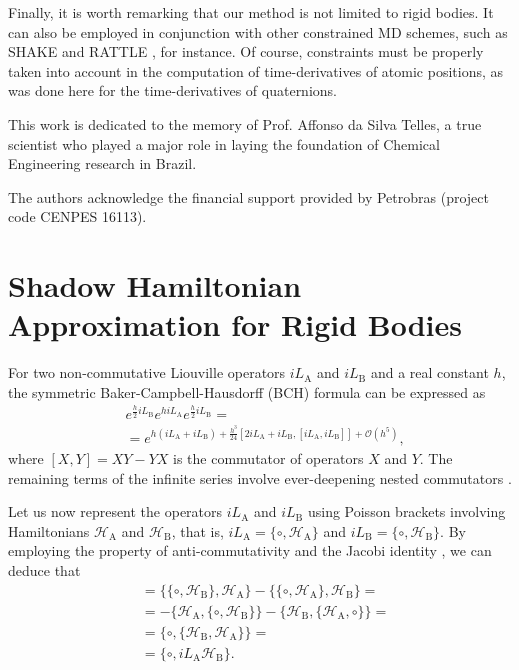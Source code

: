 \documentclass[
	aip,
	jcp,
	reprint,
]{revtex4-1}
\newcommand{\Ham}[1]{{\mathcal H}_\text{#1}}           %
\newcommand{\Liu}[1]{i\!L_\text{#1}}                   %
\newcommand{\timestep}{h}
\begin{document}
Finally, it is worth remarking that our method is not limited to rigid bodies.
It can also be employed in conjunction with other constrained MD schemes, such as SHAKE \cite{Ryckaert_1977} and RATTLE \cite{Andersen_1983}, for instance.
Of course, constraints must be properly taken into account in the computation of time-derivatives of atomic positions, as was done here for the time-derivatives of quaternions.

\begin{acknowledgements}
This work is dedicated to the memory of Prof. Affonso da Silva Telles, a true scientist who played a major role in laying the foundation of Chemical Engineering research in Brazil.

The authors acknowledge the financial support provided by Petrobras (project code CENPES 16113).
\end{acknowledgements}

\appendix

\section{Shadow Hamiltonian Approximation for Rigid Bodies}
\label{sec:rigid body shadow hamiltonian}

For two non-commutative Liouville operators $\Liu A$ and $\Liu B$ and a real constant $\timestep$, the symmetric Baker-Campbell-Hausdorff (BCH) formula can be expressed as \cite{Hairer_2006}
\begin{equation}
\label{eq:symmetric BCH}
\begin{split}
&e^{\frac{\timestep}{2} \Liu B} e^{\timestep \Liu A} e^{\frac{\timestep}{2} \Liu B} = \\
&= e^{\timestep (\Liu A + \Liu B) + \frac{\timestep^3}{24} \left[2 \Liu A + \Liu B,[\Liu A,\Liu B]\right] + \mathcal{O}(\timestep^5)},
\end{split}
\end{equation}
where $[X,Y] = XY - YX$ is the commutator of operators $X$ and $Y$.
The remaining terms of the infinite series involve ever-deepening nested commutators \cite{Hairer_2006}.

Let us now represent the operators $\Liu A$ and $\Liu B$ using Poisson brackets involving Hamiltonians $\Ham A$ and $\Ham B$, that is, $\Liu A = \{\circ,\Ham A\}$ and $\Liu B = \{\circ,\Ham B\}$.
By employing the property of anti-commutativity and the Jacobi identity \cite{Hairer_2006}, we can deduce that
\begin{align*}
[\Liu A,\Liu B] &= \{\{\circ,\Ham B\},\Ham A\} - \{\{\circ,\Ham A\},\Ham B\} = \\
&= -\{\Ham A,\{\circ,\Ham B\}\} - \{\Ham B,\{\Ham A,\circ\}\} = \\
&= \{\circ,\{\Ham B,\Ham A\}\} = \\
&= \{\circ,{\Liu A} {\Ham B}\}.
\end{align*}
\end{document}
